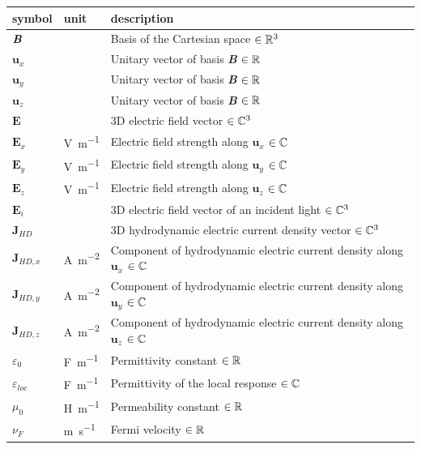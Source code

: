 \documentclass[12pt]{article}
\begin{document}
\renewcommand{\arraystretch}{1.2}
\noindent \begin{longtable*}{l l p{12cm}} \toprule
\textbf{symbol} & \textbf{unit} & \textbf{description}\\
\midrule 
$\textbf{\textit{B}}$ &   & Basis of the Cartesian space $\in \Bbb R^3$
\\
$\textbf{u}_x$ & & Unitary vector of basis \textbf{\textit{B}} $\in \Bbb R$
\\
$\textbf{u}_y$ & & Unitary vector of basis \textbf{\textit{B}} $\in \Bbb R$
\\
$\textbf{u}_z$ & & Unitary vector of basis \textbf{\textit{B}} $\in \Bbb R$
\\
$\textbf{E}$ &   & 3D electric field vector $\in \Bbb C^3$
\\
$\textbf{E}_x$ & \si{\volt \per \meter} & Electric field strength along $\textbf{u}_x$  $\in \Bbb C$
\\
$\textbf{E}_y$ & \si{\volt \per \meter} & Electric field strength along $\textbf{u}_y$ $\in \Bbb C$
\\
$\textbf{E}_z$ & \si{\volt \per \meter} & Electric field strength along $\textbf{u}_z$ $\in \Bbb C$
\\
$\textbf{E}_i$ &   & 3D electric field vector of an incident light $\in \Bbb C^3$
\\
$\textbf{J}_{HD}$ &  & 3D hydrodynamic electric current density vector $\in \Bbb C^3$
\\
$\textbf{J}_{HD,x}$ & \si{\ampere \per \square \meter} & Component of hydrodynamic electric current density along $\textbf{u}_x$ $\in \Bbb C$
\\
$\textbf{J}_{HD,y}$ & \si{\ampere \per \square \meter} & Component of hydrodynamic electric current density along $\textbf{u}_y$ $\in \Bbb C$
\\
$\textbf{J}_{HD,z}$ & \si{\ampere \per \square \meter} & Component of hydrodynamic electric current density along $\textbf{u}_z$ $\in \Bbb C$
\\
$\varepsilon_0$ & \si{\farad \per \meter} & Permittivity constant $\in \Bbb R$
\\
$\varepsilon_{loc}$ & \si{\farad \per \meter} & Permittivity  of the local response $\in \Bbb C$
\\
$\mu_0$ & \si{\henry \per \meter} & Permeability constant $\in \Bbb R$
\\
$\nu_F$ & \si{\meter \per \second} & Fermi velocity $\in \Bbb R$
\\

\end{longtable*}
\end{document}
